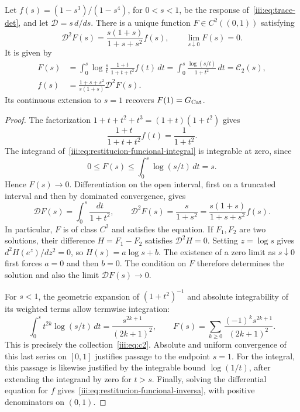 \begin{theorem}
\label{iii:thm:restitucion-funcional-catalan}
Let $f(s)=(1-s^3)/(1-s^4)$, for $0<s<1$, be the response
of~\eqref{iii:eq:trace-det}, and let $\mathcal D=s\,d/ds$.
There is a unique function $F\in C^2((0,1))$ satisfying
\begin{equation}
 \mathcal D^2F(s)=\frac{s(1+s)}{1+s+s^2}f(s),
 \qquad \lim_{s\downarrow0}F(s)=0.
 \label{iii:eq:restitucion-funcional-problema}
\end{equation}
It is given by
\begin{align}
 F(s)&=\int_0^s\log\frac{s}{t}\,
          \frac{1+t}{1+t+t^2}f(t)\,dt
       =\int_0^s\frac{\log(s/t)}{1+t^2}\,dt
       =\mathcal C_2(s),
 \label{iii:eq:restitucion-funcional-integral}\\
 f(s)&=\frac{1+s+s^2}{s(1+s)}\mathcal D^2F(s).
 \label{iii:eq:restitucion-funcional-inversa}
\end{align}
Its continuous extension to $s=1$ recovers $F(1)=G_{\rm Cat}$.
\end{theorem}
\begin{proof}
The factorization $1+t+t^2+t^3=(1+t)(1+t^2)$ gives
\[
 \frac{1+t}{1+t+t^2}f(t)=\frac1{1+t^2}.
\]
The integrand of~\eqref{iii:eq:restitucion-funcional-integral} is
integrable at zero, since
\[
 0\leq F(s)\leq\int_0^s\log(s/t)\,dt=s.
\]
Hence $F(s)\to0$. Differentiation on the open interval,
first on a truncated interval and then by dominated convergence,
gives
\[
 \mathcal DF(s)=\int_0^s\frac{dt}{1+t^2},
 \qquad \mathcal D^2F(s)=\frac{s}{1+s^2}
     =\frac{s(1+s)}{1+s+s^2}f(s).
\]
In particular, $F$ is of class $C^2$ and satisfies the equation.
If $F_1,F_2$ are two solutions, their difference $H=F_1-F_2$
satisfies $\mathcal D^2H=0$. Setting $z=\log s$ gives
$d^2H(e^z)/dz^2=0$, so $H(s)=a\log s+b$.
The existence of a zero limit as $s\downarrow0$ first forces
$a=0$ and then $b=0$. The condition on $F$ therefore determines
the solution and also the limit $\mathcal DF(s)\to0$.

For $s<1$, the geometric expansion of $(1+t^2)^{-1}$ and
absolute integrability of its weighted terms allow termwise integration:
\[
 \int_0^s t^{2k}\log(s/t)\,dt
     =\frac{s^{2k+1}}{(2k+1)^2},\qquad
 F(s)=\sum_{k\geq0}\frac{(-1)^ks^{2k+1}}{(2k+1)^2}.
\]
This is precisely the collection~\eqref{iii:eq:c2}. Absolute and uniform
convergence of this last series on $[0,1]$ justifies passage
to the endpoint $s=1$. For the integral, this passage is likewise
justified by the integrable bound $\log(1/t)$, after extending
the integrand by zero for $t>s$. Finally, solving the differential
equation for $f$ gives~\eqref{iii:eq:restitucion-funcional-inversa},
with positive denominators on $(0,1)$.
\end{proof}

